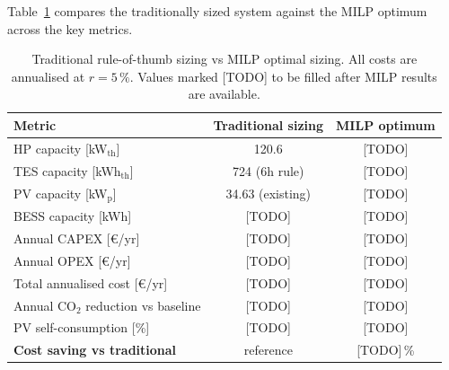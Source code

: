 \documentclass[11pt,a4paper]{report}
\begin{document}
Table~\ref{tab:trad_vs_milp} compares the traditionally sized system against
the MILP optimum across the key metrics.

\begin{table}[H]
\centering
\caption{Traditional rule-of-thumb sizing vs MILP optimal sizing.
         All costs are annualised at $r = 5\,\%$.
         Values marked [TODO] to be filled after MILP results are available.}
\label{tab:trad_vs_milp}
\begin{tabular}{lcc}
\hline
\textbf{Metric} & \textbf{Traditional sizing} & \textbf{MILP optimum} \\
\hline
HP capacity [kW$_\mathrm{th}$]      & 120.6          & [TODO] \\
TES capacity [kWh$_\mathrm{th}$]    & 724 (6h rule)  & [TODO] \\
PV capacity [kW$_\mathrm{p}$]       & 34.63 (existing) & [TODO] \\
BESS capacity [kWh]                  & [TODO]         & [TODO] \\
Annual CAPEX [\euro/yr]              & [TODO]         & [TODO] \\
Annual OPEX [\euro/yr]               & [TODO]         & [TODO] \\
Total annualised cost [\euro/yr]     & [TODO]         & [TODO] \\
Annual CO$_2$ reduction vs baseline  & [TODO]         & [TODO] \\
PV self-consumption [\%]             & [TODO]         & [TODO] \\
\hline
\textbf{Cost saving vs traditional}  & reference      & [TODO]\,\% \\
\hline
\end{tabular}
\end{table}

\end{document}
